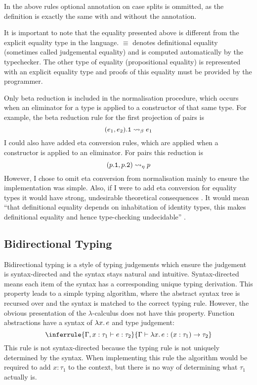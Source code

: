 \documentclass[12pt,a4paper,twoside]{report}
\begin{document}
In the above rules optional annotation on case splits is ommitted, as the definition is exactly the same with and without the annotation.

It is important to note that the equality presented above is different from the explicit equality type in the language.
\(\equiv\) denotes definitional equality (sometimes called judgemental equality) and is computed automatically by the typechecker.
The other type of equality (propositional equality) is represented with an explicit equality type and proofs of this equality must be provided by the programmer.

Only beta reduction is included in the normalisation procedure, which occurs when an eliminator for a type is applied to a constructor of that same type.
For example, the beta reduction rule for the first projection of pairs is
\[
    (e_1, e_2)\mathtt{.1} \rightsquigarrow_\beta e_1
\]
I could also have added eta conversion rules, which are applied when a constructor is applied to an eliminator.
For pairs this reduction is
\[
    (p\mathtt{.1}, p\mathtt{.2}) \rightsquigarrow_\eta p
\]
However, I chose to omit eta conversion from normalisation mainly to ensure the implementation was simple.
Also, if I were to add eta conversion for equality types it would have strong, undesirable theoretical consequences \cite{streicher93}.
It would mean ``that definitional equality depends on inhabitation of identity types, this makes definitional equality and hence type-checking undecidable'' \cite{nlabid}.

\subsection{Bidirectional Typing}

Bidirectional typing \cite{pierce98} is a style of typing judgements which ensure the judgement is syntax-directed and the syntax stays natural and intuitive.
Syntax-directed means each item of the syntax has a corresponding unique typing derivation.
This property leads to a simple typing algorithm, where the abstract syntax tree is recursed over and the syntax is matched to the correct typing rule.
However, the obvious presentation of the \(\lambda\)-calculus does not have this property.
Function abstractions have a syntax of \(\lambda x \ldotp e\) and type judgement:
\[
    \inferrule{\typing{\Gamma, x: \tau_1}{e}{\tau_2}} {\typing{\Gamma}{\fun{x}{}{e}}{\pi{x}{\tau_1}{\tau_2}}}
\]
This rule is not syntax-directed because the typing rule is not uniquely determined by the syntax.
When implementing this rule the algorithm would be required to add \(x : \tau_1\) to the context, but there is no way of determining what \(\tau_1\) actually is.
\end{document}
